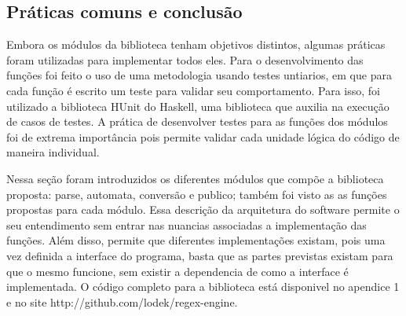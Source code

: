 \subsection{Práticas comuns e conclusão}
Embora os módulos da biblioteca tenham objetivos distintos, algumas práticas foram utilizadas para implementar todos eles.
Para o desenvolvimento das funções foi feito o uso de uma metodologia usando testes untiarios, em que para cada função é escrito um teste para validar seu comportamento.
Para isso, foi utilizado a biblioteca HUnit do Haskell, uma biblioteca que auxilia na execução de casos de testes.
A prática de desenvolver testes para as funções dos módulos foi de extrema importância pois permite validar cada unidade lógica do código de maneira individual.

Nessa seção foram introduzidos os diferentes módulos que compõe a biblioteca proposta: parse, automata, conversão e publico; também foi visto as as funções propostas para cada módulo.
Essa descrição da arquitetura do software permite o seu entendimento sem entrar nas nuancias associadas a implementação das funções.
Além disso, permite que diferentes implementações existam, pois uma vez definida a interface do programa, basta que as partes previstas existam para que o mesmo funcione, sem existir a dependencia de como a interface é implementada.
O código completo para a biblioteca está disponivel no apendice 1 e no site http://github.com/lodek/regex-engine.

